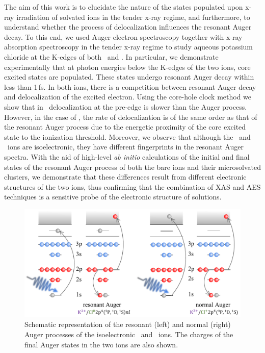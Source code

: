 The aim of this work is to elucidate the nature of the states populated upon x-ray irradiation of solvated ions in the tender x-ray regime, and furthermore, to understand whether the process of delocalization influences the resonant Auger decay. To this end, we used Auger electron spectroscopy together with x-ray absorption spectroscopy in the tender x-ray regime to study aqueous potassium chloride at the K-edges of both \ki~and \cli. In particular, we demonstrate experimentally that at photon energies below the K-edges of the two ions, core excited states are populated. These states undergo resonant Auger decay within less than 1\,fs. In both ions, there is a competition between resonant Auger decay and delocalization of the excited electron. Using the core-hole clock method we show that in \ki~delocalization at the pre-edge is slower than the Auger process. However, in the case of \cli, the rate of delocalization is of the same order as that of the resonant Auger process due to the energetic proximity of the core excited state to the ionization threshold. Moreover, we observe that although the \ki~and \cli~ions are isoelectronic, they have different fingerprints in the resonant Auger spectra. With the aid of high-level {\it ab initio} calculations of the initial and final states of the resonant Auger process of both the bare ions and their microsolvated clusters, we demonstrate that these differences result from different electronic structures of the two ions, thus confirming that the combination of XAS and AES techniques is a sensitive probe of the electronic structure of solutions.


\begin{figure}
\includegraphics[scale=0.8]{figures/auger_process.pdf}
\caption{Schematic representation of the resonant (left) and normal (right) Auger processes of the isoelectronic \ki~and \cli~ions. The charges of the final Auger states in the two ions are also shown.}
\label{fg:auger}
\end{figure}